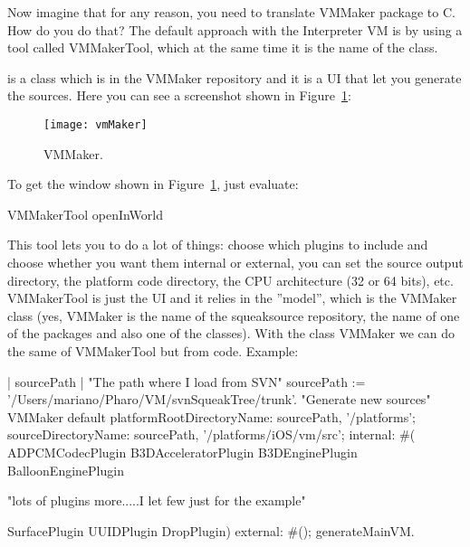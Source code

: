 \documentclass[a4paper,10pt,twoside]{book}
\begin{document}
Now imagine that for any reason, you need to translate VMMaker package to C. How do you do that? The default approach with the Interpreter VM is by using a tool called VMMakerTool, which at the same time it is the name of the class.

 is a class which is in the VMMaker repository and it is a UI that let you generate the sources. Here you can see a screenshot shown in Figure~\ref{vmMaker}:

\begin{figure}[!h]
\texttt{[image: vmMaker]}
\caption{VMMaker.\label{vmMaker}}
\end{figure}



To get the window shown in Figure~\ref{vmMaker}, just evaluate:
\begin{code}{}
VMMakerTool openInWorld
\end{code}

This tool lets you to do a lot of things: choose which plugins to include and choose whether you want them internal or external, you can set the source output directory, the platform code directory, the CPU architecture (32 or 64 bits), etc. VMMakerTool is just the UI and it relies in the ''model'', which is the VMMaker class (yes, VMMaker is the name of the squeaksource repository, the name of one of the packages and also one of the classes). With the class VMMaker we can do the same of VMMakerTool but from code. Example:

\begin{code}{}
| sourcePath |
"The path where I load from SVN"
sourcePath := '/Users/mariano/Pharo/VM/svnSqueakTree/trunk'.
"Generate new sources"
VMMaker default
	platformRootDirectoryName: sourcePath, '/platforms';
	sourceDirectoryName: sourcePath, '/platforms/iOS/vm/src';
	internal: #(
		ADPCMCodecPlugin	
		B3DAcceleratorPlugin
		B3DEnginePlugin
		BalloonEnginePlugin
 
	"lots of plugins more.....I let few just for the example"

		SurfacePlugin
		UUIDPlugin
		DropPlugin)
	external: #();
	generateMainVM.
\end{code}
\end{document}
